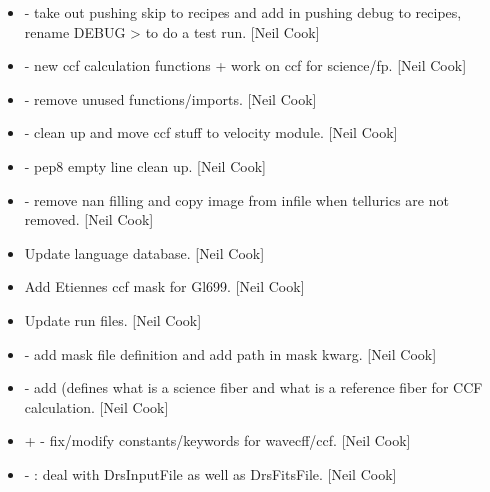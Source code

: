 \documentclass[a4paper,10pt,english]{report}
\begin{document}
\label{\detokenize{misc/changelog:id64}}\begin{itemize}
\item {} 
 - take out pushing skip to recipes
and add in pushing debug to recipes, rename DEBUG \textendash{}\textgreater{}  to do a
test run. {[}Neil Cook{]}

\item {} 
 - new ccf calculation functions + work on
ccf for science/fp. {[}Neil Cook{]}

\item {} 
 - remove unused functions/imports.
{[}Neil Cook{]}

\item {} 
 - clean up and move ccf stuff to velocity
module. {[}Neil Cook{]}

\item {} 
 - pep8 empty line clean up. {[}Neil Cook{]}

\item {} 
 - remove nan filling and copy image from infile when
tellurics are not removed. {[}Neil Cook{]}

\item {} 
Update language database. {[}Neil Cook{]}

\item {} 
Add Etiennes ccf mask for Gl699. {[}Neil Cook{]}

\item {} 
Update run files. {[}Neil Cook{]}

\item {} 
 - add mask file
definition and add path in \textendash{}mask kwarg. {[}Neil Cook{]}

\item {} 
 - add  (defines what is a
science fiber and what is a reference fiber for CCF calculation. {[}Neil
Cook{]}

\item {} 
 +  -
fix/modify constants/keywords for wavecff/ccf. {[}Neil Cook{]}

\item {} 
 - : deal with DrsInputFile as
well as DrsFitsFile. {[}Neil Cook{]}


\end{itemize}
\end{document}
